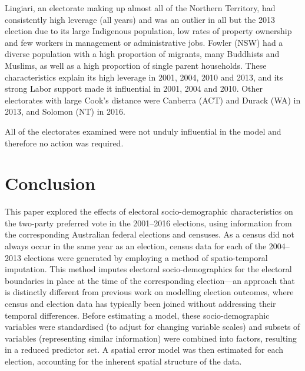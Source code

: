 \documentclass[
  times, doublespace]{anzsauth}
\begin{document}
Lingiari, an electorate making up almost all of the Northern Territory, had consistently high leverage (all years) and was an outlier in all but the 2013 election due to its large Indigenous population, low rates of property ownership and few workers in management or administrative jobs. Fowler (NSW) had a diverse population with a high proportion of migrants, many Buddhists and Muslims, as well as a high proportion of single parent households. These characteristics explain its high leverage in 2001, 2004, 2010 and 2013, and its strong Labor support made it influential in 2001, 2004 and 2010. Other electorates with large Cook's distance were Canberra (ACT) and Durack (WA) in 2013, and Solomon (NT) in 2016.

All of the electorates examined were not unduly influential in the model and therefore no action was required.

\hypertarget{conclusion}{%
\section{Conclusion}\label{conclusion}}

This paper explored the effects of electoral socio-demographic characteristics on the two-party preferred vote in the 2001--2016 elections, using information from the corresponding Australian federal elections and censuses. As a census did not always occur in the same year as an election, census data for each of the 2004--2013 elections were generated by employing a method of spatio-temporal imputation. This method imputes electoral socio-demographics for the electoral boundaries in place at the time of the corresponding election---an approach that is distinctly different from previous work on modelling election outcomes, where census and election data has typically been joined without addressing their temporal differences. Before estimating a model, these socio-demographic variables were standardised (to adjust for changing variable scales) and subsets of variables (representing similar information) were combined into factors, resulting in a reduced predictor set. A spatial error model was then estimated for each election, accounting for the inherent spatial structure of the data.
\end{document}
